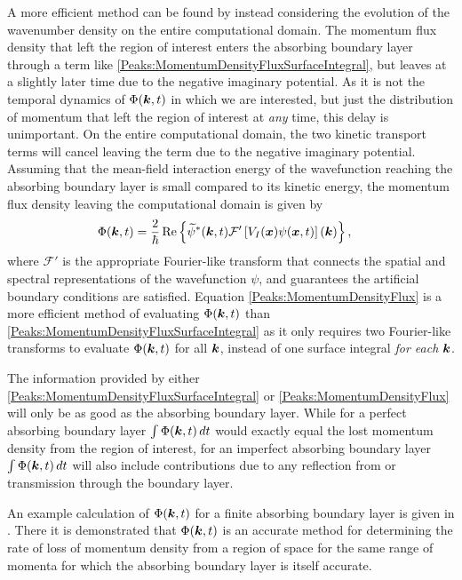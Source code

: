 A more efficient method can be found by instead considering the evolution of the wavenumber density on the entire computational domain. The momentum flux density that left the region of interest enters the absorbing boundary layer through a term like \eqref{Peaks:MomentumDensityFluxSurfaceIntegral}, but leaves at a slightly later time due to the negative imaginary potential. As it is not the temporal dynamics of $\Phi(\bm{k}, t)$ in which we are interested, but just the distribution of momentum that left the region of interest at \emph{any} time, this delay is unimportant. On the entire computational domain, the two kinetic transport terms will cancel leaving the term due to the negative imaginary potential. Assuming that the mean-field interaction energy of the wavefunction reaching the absorbing boundary layer is small compared to its kinetic energy, the momentum flux density leaving the computational domain is given by
\begin{align}
    \label{Peaks:MomentumDensityFlux}
    \Phi(\vect{k}, t)&=\frac{2}{\hbar} \Re \left\{ \widetilde{\psi}^*(\vect{k}, t) \mathcal{F}'\left[ V_I(\vect{x}) \psi(\vect{x}, t)\right](\vect{k}) \right\},
\end{align}
where $\mathcal{F}'$ is the appropriate Fourier-like transform that connects the spatial and spectral representations of the wavefunction $\psi$, and guarantees the artificial boundary conditions are satisfied. Equation \eqref{Peaks:MomentumDensityFlux} is a more efficient method of evaluating $\Phi(\bm{k}, t)$ than \eqref{Peaks:MomentumDensityFluxSurfaceIntegral} as it only requires two Fourier-like transforms to evaluate $\Phi(\bm{k}, t)$ for all $\bm{k}$, instead of one surface integral \emph{for each} $\bm{k}$.

The information provided by either \eqref{Peaks:MomentumDensityFluxSurfaceIntegral} or \eqref{Peaks:MomentumDensityFlux} will only be as good as the absorbing boundary layer. While for a perfect absorbing boundary layer $\int \Phi(\bm{k}, t)\, dt$ would exactly equal the lost momentum density from the region of interest, for an imperfect absorbing boundary layer $\int \Phi(\bm{k}, t)\, dt$ will also include contributions due to any reflection from or transmission through the boundary layer. 

An example calculation of $\Phi(\bm{k}, t)$ for a finite absorbing boundary layer is given in . There it is demonstrated that $\Phi(\bm{k}, t)$ is an accurate method for determining the rate of loss of momentum density from a region of space for the same range of momenta for which the absorbing boundary layer is itself accurate.

